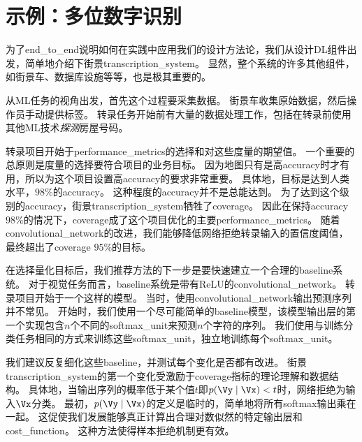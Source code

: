 
\section{示例：多位数字识别}
\label{sec:example_multi_digit_number_recognition}
为了\gls{end_to_end}说明如何在实践中应用我们的设计方法论，我们从设计\gls{DL}组件出发，简单地介绍下街景\gls{transcription_system}。
显然，整个系统的许多其他组件，如街景车、数据库设施等等，也是极其重要的。


从\gls{ML}任务的视角出发，首先这个过程要采集数据。
街景车收集原始数据，然后操作员手动提供标签。
转录任务开始前有大量的数据处理工作，包括在转录前使用其他\gls{ML}技术\emph{探测}房屋号码。


转录项目开始于\gls{performance_metrics}的选择和对这些度量的期望值。
一个重要的总原则是度量的选择要符合项目的业务目标。
因为地图只有是高\gls{accuracy}时才有用，所以为这个项目设置高\gls{accuracy}的要求非常重要。
具体地，目标是达到人类水平，$98\%$的\gls{accuracy}。
这种程度的\gls{accuracy}并不是总能达到。
为了达到这个级别的\gls{accuracy}，街景\gls{transcription_system}牺牲了\gls{coverage}。
因此在保持\gls{accuracy} $98\%$的情况下，\gls{coverage}成了这个项目优化的主要\gls{performance_metrics}。
随着\gls{convolutional_network}的改进，我们能够降低网络拒绝转录输入的置信度阈值，最终超出了\gls{coverage} $95\%$的目标。


在选择量化目标后，我们推荐方法的下一步是要快速建立一个合理的\gls{baseline}系统。
对于视觉任务而言，\gls{baseline}系统是带有\gls{ReLU}的\gls{convolutional_network}。
转录项目开始于一个这样的模型。
当时，使用\gls{convolutional_network}输出预测序列并不常见。
开始时，我们使用一个尽可能简单的\gls{baseline}模型，该模型输出层的第一个实现包含$n$个不同的\gls{softmax_unit}来预测$n$个字符的序列。
我们使用与训练分类任务相同的方式来训练这些\gls{softmax_unit}，独立地训练每个\gls{softmax_unit}。


我们建议反复细化这些\gls{baseline}，并测试每个变化是否都有改进。
街景\gls{transcription_system}的第一个变化受激励于\gls{coverage}指标的理论理解和数据结构。
具体地，当输出序列的概率低于某个值$t$即$p(\Vy\mid\Vx) < t$时，网络拒绝为输入$\Vx$分类。
最初，$p(\Vy\mid\Vx)$的定义是临时的，简单地将所有\gls{softmax}输出乘在一起。
这促使我们发展能够真正计算出合理对数似然的特定输出层和\gls{cost_function}。%
这种方法使得样本拒绝机制更有效。


